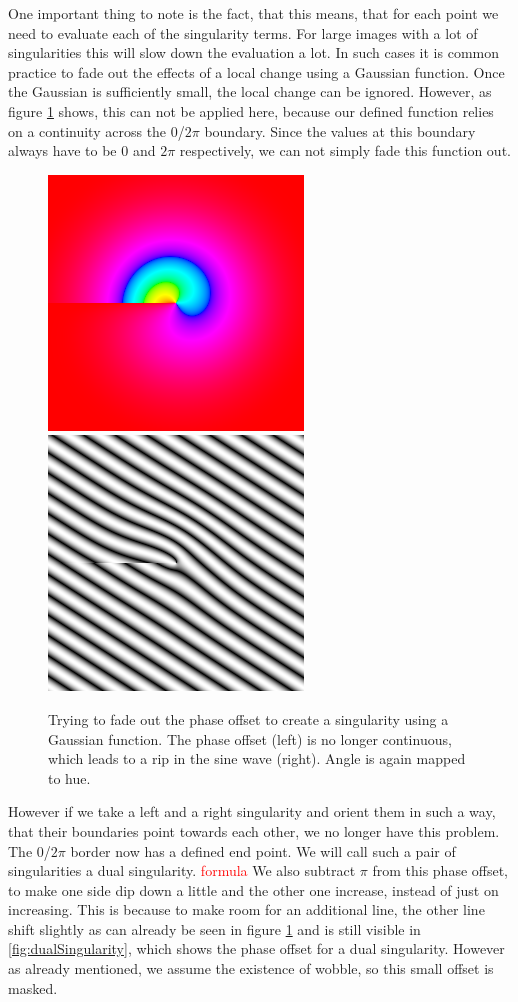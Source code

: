 \documentclass{utue} %
\begin{document}
One important thing to note is the fact, that this means, that for each point we need to evaluate each of the singularity terms. For large images with a lot of singularities this will slow down the evaluation a lot. In such cases it is common practice to fade out the effects of a local change using a Gaussian function. Once the Gaussian is sufficiently small, the local change can be ignored. However, as figure \ref{fig:fadedSingularity} shows, this can not be applied here, because our defined function relies on a continuity across the $0$/$2\pi$ boundary. Since the values at this boundary always have to be $0$ and $2\pi$ respectively, we can not simply fade this function out.
\begin{figure}[h]
  \centering
  \includegraphics[width=0.45\linewidth]{images/fadedPhase}
  \includegraphics[width=0.45\linewidth]{images/fadedPhaseSineWave}
  \caption{Trying to fade out the phase offset to create a singularity using a Gaussian function. The phase offset (left) is no longer continuous, which leads to a rip in the sine wave (right). Angle is again mapped to hue.}\label{fig:fadedSingularity}
\end{figure}
However if we take a left and a right singularity and orient them in such a way, that their boundaries point towards each other, we no longer have this problem. The $0$/$2\pi$ border now has a defined end point. We will call such a pair of singularities a dual singularity. 
\textcolor{red}{formula}
We also subtract $\pi$ from this phase offset, to make one side dip down a little and the other one increase, instead of just on increasing. This is because to make room for an additional line, the other line shift slightly as can already be seen in figure \ref{fig:fadedSingularity} and is still visible in \ref{fig:dualSingularity}, which shows the phase offset for a dual singularity. However as already mentioned, we assume the existence of wobble, so this small offset is masked.
\end{document}
